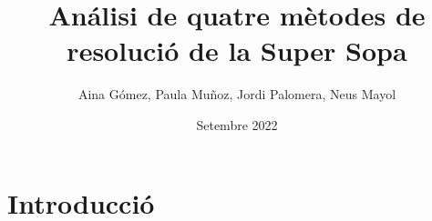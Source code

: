\documentclass{article}
\title{Análisi de quatre mètodes de resolució de la Super Sopa}
\author{Aina Gómez, Paula Muñoz, Jordi Palomera, Neus Mayol}
\date{Setembre 2022}
\begin{document}
\maketitle

\section{Introducció}
\end{document}
